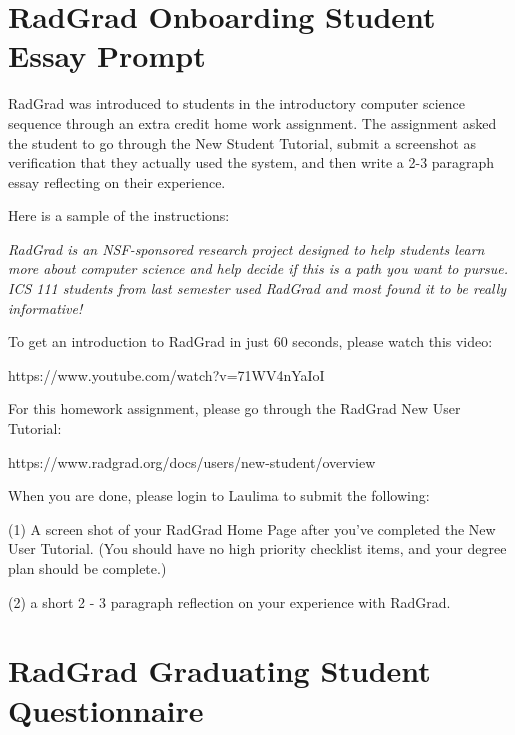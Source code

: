 \documentclass[acmsmall]{acmart}
\begin{document}
\appendix

\section{RadGrad Onboarding Student Essay Prompt}
\label{sec:onboarding-student-essay-prompt}

RadGrad was introduced to students in the introductory computer science sequence through an extra credit home work assignment. The assignment asked the student to go through the New Student Tutorial, submit a screenshot as verification that they actually used the system, and then write a 2-3 paragraph essay reflecting on their experience.

Here is a sample of the instructions:

{\em
RadGrad is an NSF-sponsored research project designed to help students learn more about computer science and help decide if this is a path you want to pursue.  ICS 111 students from last semester used RadGrad and most found it to be really informative!

To get an introduction to RadGrad in just 60 seconds, please watch this video:

https://www.youtube.com/watch?v=71WV4nYaIoI

For this homework assignment, please go through the RadGrad New User Tutorial:

https://www.radgrad.org/docs/users/new-student/overview

When you are done, please login to Laulima to submit the following:

(1) A screen shot of your RadGrad Home Page after you’ve completed the New User Tutorial. (You should have no high priority checklist items, and your degree plan should be complete.)

(2) a short 2 - 3 paragraph reflection on your experience with RadGrad.
}


\section{RadGrad Graduating Student Questionnaire}
\label{sec:graduating-student-questionnaire}
\end{document}
